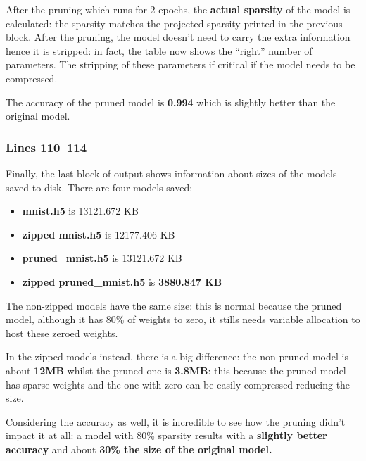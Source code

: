 After the pruning which runs for 2 epochs, the \textbf{actual sparsity} of the
model is calculated: the sparsity matches the projected sparsity printed in the
previous block. After the pruning, the model doesn't need to carry the extra
information hence it is stripped: in fact, the table now shows the ``right''
number of parameters. The stripping of these parameters if critical if the
model needs to be compressed.

The accuracy of the pruned model is \textbf{0.994} which is slightly better
than the original model.

\subsubsection{Lines 110--114}
Finally, the last block of output shows information about sizes of the models
saved to disk. There are four models saved:
\begin{itemize}
    \item \textbf{mnist.h5} is 13121.672 KB
    \item \textbf{zipped mnist.h5} is 12177.406 KB
    \item \textbf{pruned\_mnist.h5} is 13121.672 KB
    \item \textbf{zipped pruned\_mnist.h5} is \textbf{3880.847 KB}
\end{itemize}
The non-zipped models have the same size: this is normal because the pruned
model, although it has 80\% of weights to zero, it stills needs variable
allocation to host these zeroed weights.

In the zipped models instead, there is a big difference: the non-pruned model
is about \textbf{12MB} whilst the pruned one is \textbf{3.8MB}: this because
the pruned model has sparse weights and the one with zero can be easily
compressed reducing the size.

Considering the accuracy as well, it is incredible to see how the pruning
didn't impact it at all: a model with 80\% sparsity results with a
\textbf{slightly better accuracy} and about \textbf{30\% the size of the
original model.}
